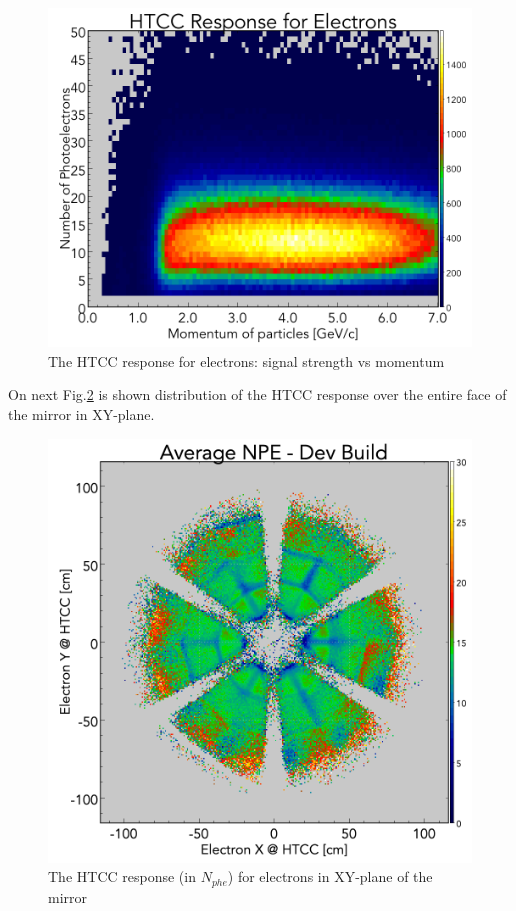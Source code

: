 \begin{figure}[!h]
    \centering
    \includegraphics[width=1.0\linewidth,trim={0.0cm 0.0cm 0.0cm 1.73cm},clip]{images/HTCC_Response_run4013.png}
    \caption{The HTCC response for electrons: signal strength vs momentum}
    \label{fig:HTCC_Response_run4013}
\end{figure}
On next  Fig.\ref{fig:avgNPE_Theta_Phi_Dev_Build-2_NO_HOLES} is shown distribution of the HTCC response over the entire face of the mirror in XY-plane.
\begin{figure}[!h]
    \centering
    \includegraphics[width=1.0\linewidth,trim={0.0cm 0.0cm 0.0cm 1.67cm},clip]{images/avgNPE_Theta_Phi_Dev_Build-2_NO_HOLES.png}
    \caption{The HTCC response (in $N_{phe}$) for electrons in XY-plane of the mirror}
    \label{fig:avgNPE_Theta_Phi_Dev_Build-2_NO_HOLES}
\end{figure}
